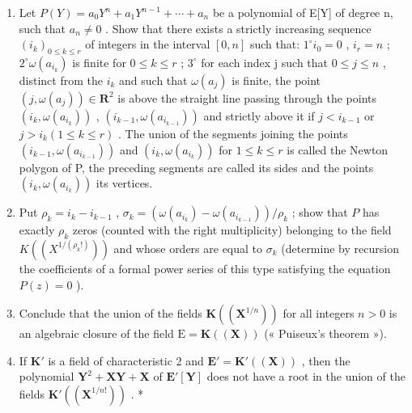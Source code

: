\begin{enumerate}
\def\labelenumi{\alph{enumi})}
\item
  Let \(P(Y) = a_{0}Y^{n} + a_{1}Y^{n-1} + \cdots + a_{n}\) be a polynomial of E{[}Y{]} of degree n, such that \(a_{n} \neq 0\) . Show that there exists a strictly increasing sequence \((i_{k})_{0 \leqslant k \leqslant r}\) of integers in the interval \([0, n]\) such that: \(1^{\circ} i_{0} = 0\) , \(i_{r} = n\) ; \(2^{\circ} \omega(a_{i_{k}})\) is finite for \(0 \leqslant k \leqslant r\) ; \(3^{\circ}\) for each index j such that \(0 \leqslant j \leqslant n\) , distinct from the \(i_{k}\) and such that \(\omega(a_{j})\) is finite, the point \((j, \omega(a_{j})) \in \mathbf{R}^{2}\) is above the straight line passing through the points \((i_{k}, \omega(a_{i_{k}}))\) , \((i_{k-1}, \omega(a_{i_{k-1}}))\) and strictly above it if \(j < i_{k-1}\) or \(j > i_{k} (1 \leqslant k \leqslant r)\) . The union of the segments joining the points \((i_{k-1}, \omega(a_{i_{k-1}}))\) and \((i_{k}, \omega(a_{i_{k}}))\) for \(1 \leqslant k \leqslant r\) is called the Newton polygon of P, the preceding segments are called its sides and the points \((i_{k}, \omega(a_{i_{k}}))\) its vertices.
\item
  Put \(\rho_{k} = i_{k} - i_{k - 1}\) , \(\sigma_{k} = (\omega (a_{i_{k}}) - \omega (a_{i_{k - 1}})) / \rho_{k}\) ; show that \(P\) has exactly \(\rho_{k}\) zeros (counted with the right multiplicity) belonging to the field \(K((X^{1 / (\rho_k!)}))\) and whose orders are equal to \(\sigma_{k}\) (determine by recursion the coefficients of a formal power series of this type satisfying the equation \(P(z) = 0\) ).
\item
  Conclude that the union of the fields \(\mathbf{K}((\mathbf{X}^{1 / n}))\) for all integers \(n > 0\) is an algebraic closure of the field \(\mathrm{E} = \mathbf{K}((\mathbf{X}))\) (« Puiseux's theorem »).
\item
  If \(\mathbf{K}'\) is a field of characteristic 2 and \(\mathbf{E}' = \mathbf{K}'((\mathbf{X}))\) , then the polynomial \(\mathbf{Y}^2 + \mathbf{X}\mathbf{Y} + \mathbf{X}\) of \(\mathbf{E}'[\mathbf{Y}]\) does not have a root in the union of the fields \(\mathbf{K}'((\mathbf{X}^{1/n!}))\) . *
\end{enumerate}

